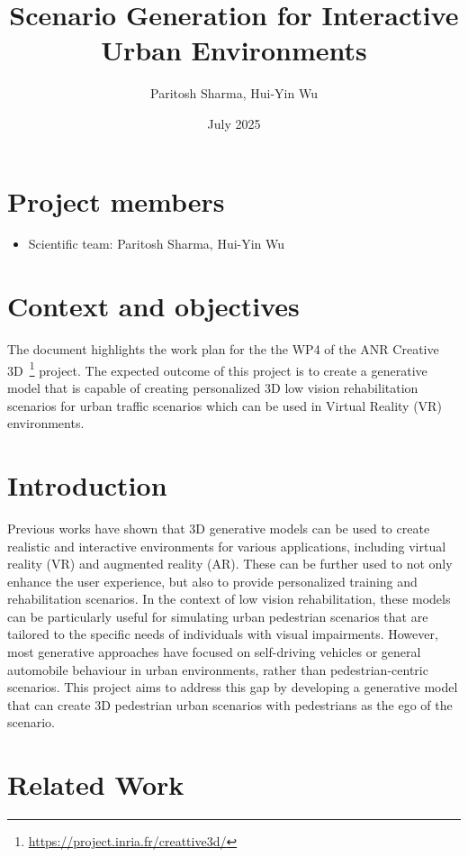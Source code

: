 \documentclass{article}
\title{Scenario Generation for Interactive Urban Environments}
\author{Paritosh Sharma, Hui-Yin Wu}
\date{July 2025}
\begin{document}
\maketitle

\section*{Project members}

\begin{itemize}
    \item Scientific team: Paritosh Sharma, Hui-Yin Wu
\end{itemize}

\section{Context and objectives}

The document highlights the work plan for the the WP4 of the ANR Creative 3D~\footnote{\url{https://project.inria.fr/creattive3d/}} project. The expected outcome of this project is to create a generative model that is capable of creating personalized 3D low vision rehabilitation scenarios for urban traffic scenarios which can be used in Virtual Reality (VR) environments.

\section{Introduction}

Previous works have shown that 3D generative models can be used to create realistic and interactive environments for various applications, including virtual reality (VR) and augmented reality (AR). These can be further used to not only enhance the user experience, but also to provide personalized training and rehabilitation scenarios. In the context of low vision rehabilitation, these models can be particularly useful for simulating urban pedestrian scenarios that are tailored to the specific needs of individuals with visual impairments. However, most generative approaches have focused on self-driving vehicles or general automobile behaviour in urban environments, rather than pedestrian-centric scenarios. This project aims to address this gap by developing a generative model that can create 3D pedestrian urban scenarios with pedestrians as the ego of the scenario.

\section{Related Work}
\end{document}
